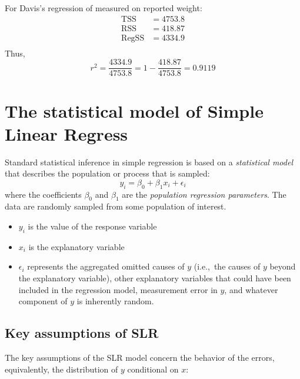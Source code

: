 For Davis's regression of measured on reported weight:
$$
\begin{aligned}
\mbox{TSS} &= 4753.8\\
\mbox{RSS} &= 418.87\\
\mbox{RegSS} &=  4334.9\\
\end{aligned}
$$
Thus, 
$$
r^2 = \frac{4334.9}{4753.8} = 1 - \frac{418.87}{4753.8} =0.9119
$$

\section*{The statistical model of Simple Linear Regress}

Standard statistical inference in simple regression is based on a {\it statistical model} that describes the population or process that is sampled:
$$
y_i = \beta_0 + \beta_1 x_i + \epsilon_i
$$
where the coefficients $\beta_0$ and $\beta_1$ are the {\it population regression parameters}.
The data are randomly sampled from some population of interest.
\begin{itemize}
  \item $y_i$ is the value of the response variable
  \item $x_i$ is the explanatory variable
  \item $\epsilon_i$ represents the aggregated omitted causes of $y$ (i.e.,~the causes of $y$ beyond the explanatory variable), other explanatory variables that could have been included in the regression model, measurement error in $y$, and whatever component of $y$ is inherently random.
\end{itemize}

\subsection*{Key assumptions of SLR}
The key assumptions of the SLR model concern the behavior of the errors, equivalently, the distribution of $y$ conditional on $x$:


